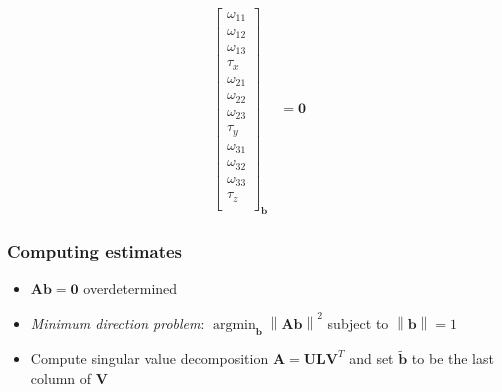 \documentclass{beamer}
\begin{document}
\begin{frame}
\begin{itemize}[<+->]
{\begin{align*}
{\begin{bmatrix}
            \omega_{11} \\
            \omega_{12} \\
            \omega_{13} \\
            \tau_x \\
            \omega_{21} \\
            \omega_{22} \\
            \omega_{23} \\
            \tau_y \\
            \omega_{31} \\
            \omega_{32} \\
            \omega_{33} \\
            \tau_z \\
          \end{bmatrix}
        }_{
          \mathbf{b}
        }
          &=
          \mathbf{0}
        \end{align*}
      }
      \end{itemize}
\end{frame}

\newcommand{\norm}[1]{\left\lVert#1\right\rVert}

\begin{frame}
  \frametitle{Computing estimates}
  \begin{itemize}[<+->]
    \item $\mathbf{A} \mathbf{b} = \mathbf{0}$ overdetermined
    \item \emph{Minimum direction problem}:
      $\operatorname{argmin}_\mathbf{b}\norm{\mathbf{Ab}}^2$ subject to
      $\norm{\mathbf{b}} = 1$
    \item Compute singular value decomposition $\mathbf{A} = \mathbf{ULV}^T$
      and set $\mathbf{\tilde{b}}$ to be the last column of $\mathbf{V}$
  \end{itemize}
\end{frame}
\end{document}

